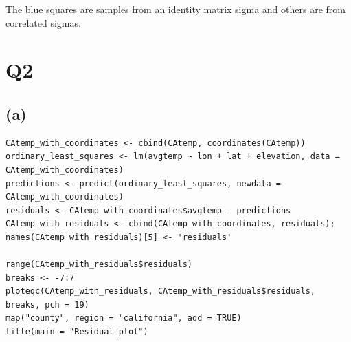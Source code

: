 \documentclass[11pt]{article}
\begin{document}
\begin{figure}[h!]
\end{figure}
The blue squares are samples from an identity matrix sigma and others are from correlated sigmas.

\section*{Q2}
\subsection*{(a)}
    \begin{lstlisting}
CAtemp_with_coordinates <- cbind(CAtemp, coordinates(CAtemp))
ordinary_least_squares <- lm(avgtemp ~ lon + lat + elevation, data = CAtemp_with_coordinates)
predictions <- predict(ordinary_least_squares, newdata = CAtemp_with_coordinates)
residuals <- CAtemp_with_coordinates$avgtemp - predictions
CAtemp_with_residuals <- cbind(CAtemp_with_coordinates, residuals); names(CAtemp_with_residuals)[5] <- 'residuals'

range(CAtemp_with_residuals$residuals)
breaks <- -7:7
ploteqc(CAtemp_with_residuals, CAtemp_with_residuals$residuals, breaks, pch = 19)
map("county", region = "california", add = TRUE)
title(main = "Residual plot")
    \end{lstlisting}
\end{document}

